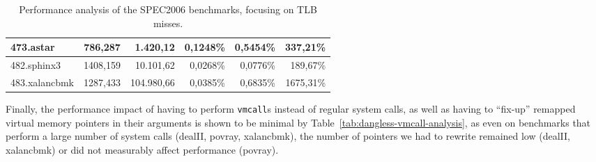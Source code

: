 \begin{table}[]
\begin{tabular}{|l|r|r|r|r|r|}
		473.astar          & 786,287                                                                                                                      & 1.420,12                                                                                                             & 0,1248\%                                                                                                                 & 0,5454\%                                                                                                                 & 337,21\%                                                                                                                            \\ \hline
		482.sphinx3        & 1408,159                                                                                                                     & 10.101,62                                                                                                            & 0,0268\%                                                                                                                 & 0,0776\%                                                                                                                 & 189,67\%                                                                                                                            \\ \hline
		483.xalancbmk      & 1287,433                                                                                                                     & 104.980,66                                                                                                           & 0,0385\%                                                                                                                 & 0,6835\%                                                                                                                 & 1675,31\%                                                                                                                           \\ \hline
	\end{tabular}
	\caption{Performance analysis of the SPEC2006 benchmarks, focusing on TLB misses.}
	\label{tab:perf-analysis-tlb}
\end{table}

Finally, the performance impact of having to perform \lstinline!vmcall!s instead of regular system calls, as well as having to ``fix-up'' remapped virtual memory pointers in their arguments is shown to be minimal by Table~\ref{tab:dangless-vmcall-analysis}, as even on benchmarks that perform a large number of system calls (dealII, povray, xalancbmk), the number of pointers we had to rewrite remained low (dealII, xalancbmk) or did not measurably affect performance (povray).

